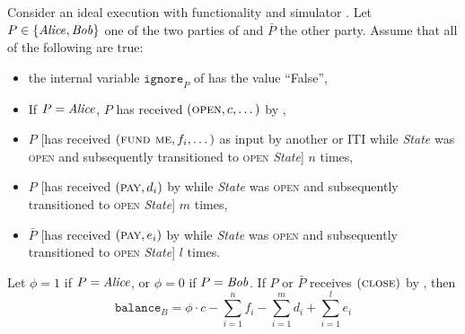 \begin{lemma}
\label{lemma:ideal-balance}
  Consider an ideal execution with functionality \fchan and simulator
  \simulator.
  Let $P \in \{\mathit{Alice}, \mathit{Bob}\}$ one of the two parties of \fchan and $\bar{P}$
  the other party. Assume that all of the following are true:
  \begin{itemize}
    \item the internal variable $\texttt{ignore}_P$ of \fchan has the value
    ``False'',
    \item If $P = \mathit{Alice}$, $P$ has received $(\textsc{open}, c, \dots)$ by
    \environment,
    \item $P$ [has received $(\textsc{fund me}, f_i, \dots)$ as input by another
    \fchan or \pchan ITI while \textit{State} was \textsc{open} and subsequently
    \fchan transitioned to \textsc{open} \textit{State}] $n$ times,
    \item $P$ [has received $(\textsc{pay}, d_i)$ by \environment while
    \textit{State} was \textsc{open} and \fchan subsequently transitioned to
    \textsc{open} \textit{State}] $m$ times,
    \item $\bar{P}$ [has received $(\textsc{pay}, e_i)$ by \environment while
    \textit{State} was \textsc{open} and \fchan subsequently transitioned to
    \textsc{open} \textit{State}] $l$ times.
  \end{itemize}
  Let $\phi = 1$ if $P = \mathit{Alice}$, or $\phi = 0$ if $P = \mathit{Bob}$. If $P$ or
  $\bar{P}$ receives $(\textsc{close})$ by \simulator, then
  \begin{equation}
    \texttt{balance}_B = \phi \cdot c - \sum\limits_{i=1}^n f_i -
    \sum\limits_{i=1}^m d_i + \sum\limits_{i=1}^l e_i
  \end{equation}
\end{lemma}
